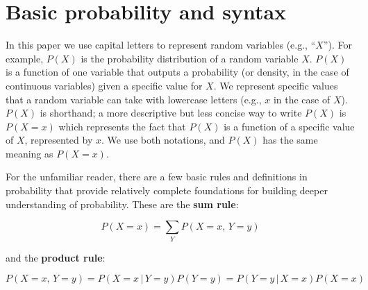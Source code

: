 \documentclass[12pt]{article}
\begin{document}


\appendix
\section{Basic probability and syntax}
\label{prob-theory}

In this paper we use capital letters to represent random variables
(e.g., ``$X$''). For example, $P(X)$ is the probability distribution
of a random variable $X$. $P(X)$ is a function of one variable that
outputs a probability (or density, in the case of continuous
variables) given a specific value for $X$. We represent specific
values that a random variable can take with lowercase letters (e.g.,
$x$ in the case of $X$). $P(X)$ is shorthand; a more descriptive but
less concise way to write $P(X)$ is $P(X=x)$ which represents the fact
that $P(X)$ is a function of a specific value of $X$, represented by
$x$. We use both notations, and $P(X)$ has the same meaning as
$P(X=x)$.

For the unfamiliar reader, there are a few basic rules and definitions
in probability that provide relatively complete foundations for
building deeper understanding of probability. These are the \textbf{sum rule}:

\begin{equation}
  P(X=x) = \sum_Y P(X=x,\, Y=y)
  \label{eq:sum}
\end{equation}

and the \textbf{product rule}:

\begin{equation}
  P(X=x, \, Y=y) = P(X = x \, | \, Y=y ) P(Y=y) = P(Y = y \, | \, X=x ) P(X=x)
  \label{eq:product}
\end{equation}
\end{document}
